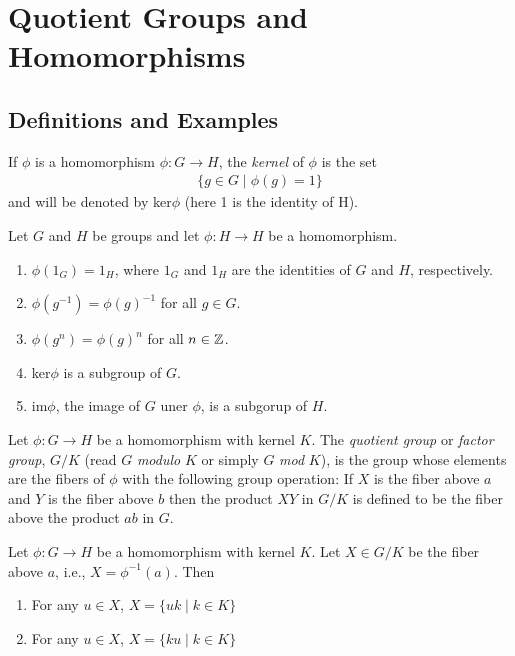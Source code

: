 \documentclass[../main]{subfiles}
\begin{document}
 
 \section{Quotient Groups and Homomorphisms}
 
 
 \subsection{Definitions and Examples}
 

 \begin{dfn}
  If $\phi$ is a homomorphism $\phi \colon G \to H$, the \textit{kernel} of $\phi$ is the set
  \begin{align*}
   \{g\in G \mid \phi(g)= 1\}
  \end{align*}
  and will be denoted by ker$\phi$ (here 1 is the identity of H).
 \end{dfn}

 
 \begin{prop}
  Let $G$ and $H$ be groups and let $\phi \colon H \to H$ be a homomorphism.
  \begin{enumerate}
   \item $\phi(1_G)=1_H$, where $1_G$ and $1_H$ are the identities of $G$ and $H$, respectively.
   \item $\phi(g^{-1})=\phi(g)^{-1}$ for all $g\in G$.
   \item $\phi(g^n)=\phi(g)^n$ for all $n\in \mathbb{Z}$.
   \item ker$\phi$ is a subgroup of $G$.
   \item im$\phi$, the image of $G$ uner $\phi$, is a subgorup of $H$.
  \end{enumerate}
 \end{prop}

 
 \begin{dfn}
  Let $\phi \colon G\to H$ be a homomorphism with kernel $K$. The \textit{quotient group} or \textit{factor group}, $G/K$ (read $G$ \textit{modulo} $K$ or simply $G$ \textit{mod} $K$), is the group whose elements are the fibers of $\phi$ with the following group operation: If $X$ is the fiber above $a$ and $Y$ is the fiber above $b$ then the product $XY$ in $G/K$ is defined to be the fiber above the product $ab$ in $G$.
 \end{dfn}

 
 \begin{prop}
  Let $\phi \colon G \to H$ be a homomorphism with kernel $K$. Let $X\in G/K$ be the fiber above $a$, i.e., $X=\phi^{-1}(a)$. Then 
  \begin{enumerate}
   \item For any $u\in X$,  $X=\{uk\mid k\in K\}$
   \item For any $u\in X$,  $X=\{ku\mid k\in K\}$
  \end{enumerate}
 \end{prop}
 
\end{document}
